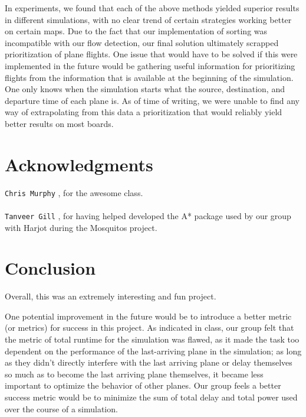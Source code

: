 \documentclass[10pt]{article}
\newcommand{\ms}[1] {
  \texttt{#1}
}
\begin{document}
In experiments, we found that each of the above methods yielded superior results in different
simulations, with no clear trend of certain strategies working better on certain maps. Due to the
fact that our implementation of sorting was incompatible with our flow detection, our final solution
ultimately scrapped prioritization of plane flights. One issue that would have to be solved if this
were implemented in the future would be gathering useful information for prioritizing flights from
the information that is available at the beginning of the simulation. One only knows when the simulation
starts what the source, destination, and departure time of each plane is. As of time of writing, we 
were unable to find any way of extrapolating from this data a prioritization that would reliably yield
better results on most boards.

\newpage
\section{Acknowledgments}

\ms{Chris Murphy}, for the awesome class.\\\\
\ms{Tanveer Gill}, for having helped developed the A* package used by our group with Harjot during
the Mosquitos project.

\newpage
\section{Conclusion}

Overall, this was an extremely interesting and fun project.

One potential improvement in the future would be to introduce a better metric (or metrics) for success
in this project. As indicated in class, our group felt that the metric of total runtime for the simulation
was flawed, as it made the task too dependent on the performance of the last-arriving plane in the simulation;
as long as they didn't directly interfere with the last arriving plane or delay themselves so much
as to become the last arriving plane themselves, it became less important to optimize the behavior
of other planes. Our group feels a better success metric would be to minimize the sum of total delay and 
total power used over the course of a simulation.
  
\end{document}
